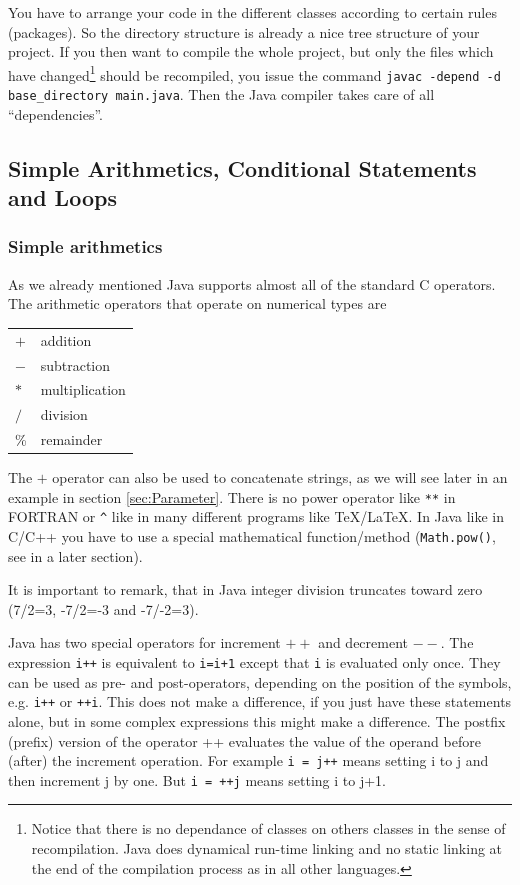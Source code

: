 You have to arrange your code in the different classes according to 
certain rules (packages). So the directory structure is already a
nice tree structure of your project. If you then want to compile
the whole project, but only the files which have changed\footnote{Notice
that there is no dependance of classes on others classes in the
sense of recompilation. Java does dynamical run-time linking and no static 
linking at the end of the compilation process as in all other languages.}
should be recompiled, you issue the
command \verb|javac -depend -d base_directory main.java|. Then
the Java compiler takes care of all ``dependencies''.   

\subsection{Simple Arithmetics, Conditional Statements and Loops}
\label{sec:Loops}

\subsubsection{Simple arithmetics}
As we already mentioned Java  supports almost all of the standard
C operators. The arithmetic operators that operate on numerical types
are 
\begin{center}
\begin{tabular}{ll}
$+$ & addition \\
$-$ & subtraction                 \\
$*$ & multiplication \\
$/$ & division \\
\% & remainder
\end{tabular}
\end{center}
The $+$ operator can also be used to concatenate strings, as we will
see later in an example in section \ref{sec:Parameter}.
There is no power operator like \verb|**| in FORTRAN or \verb|^| like in many
different programs like TeX/LaTeX. In Java like in C/C++ you have to use
a special mathematical function/method 
(\verb|Math.pow()|, see in a later section).

It is important to remark, that in Java integer division truncates
toward zero (7/2=3, -7/2=-3 and -7/-2=3).

Java has two special operators for increment $++$ and decrement $--$. The 
expression \verb|i++| is equivalent to \verb|i=i+1| except that
\verb|i| is evaluated only once. They can be used as pre- and post-operators,
depending on the position of the symbols, e.g. \verb|i++| or \verb|++i|.
This does not make a difference, if you just have these statements
alone, but in some complex expressions this might make a difference.
The postfix (prefix) version of the operator ++ evaluates  the value
of the operand before (after) the increment operation.
For example \verb|i = j++| means setting i to j and then increment j by one.
But \verb|i = ++j| means setting i to j+1.

